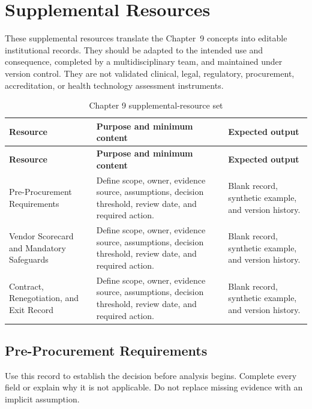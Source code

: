 \section{Supplemental Resources}
\label{sec:comp-ch09-supplemental}

These supplemental resources translate the Chapter~9 concepts into editable
institutional records. They should be adapted to the intended use and consequence,
completed by a multidisciplinary team, and maintained under version control. They
are not validated clinical, legal, regulatory, procurement, accreditation, or health
technology assessment instruments.

\begin{longtable}{@{}p{}p{}p{}@{}}
\caption{Chapter 9 supplemental-resource set}
\label{tab:comp-ch09-supplemental-set}\\
\toprule
\textbf{Resource} & \textbf{Purpose and minimum content} & \textbf{Expected output} \\
\midrule
\endfirsthead
\toprule
\textbf{Resource} & \textbf{Purpose and minimum content} & \textbf{Expected output} \\
\midrule
\endhead
\bottomrule
\endlastfoot
Pre-Procurement Requirements & Define scope, owner, evidence source, assumptions, decision threshold, review date, and required action. & Blank record, synthetic example, and version history. \\
Vendor Scorecard and Mandatory Safeguards & Define scope, owner, evidence source, assumptions, decision threshold, review date, and required action. & Blank record, synthetic example, and version history. \\
Contract, Renegotiation, and Exit Record & Define scope, owner, evidence source, assumptions, decision threshold, review date, and required action. & Blank record, synthetic example, and version history. \\
\end{longtable}

\subsection{Pre-Procurement Requirements}
\label{sec:comp-ch09-supp-1}
Use this record to establish the decision before analysis begins. Complete every
field or explain why it is not applicable. Do not replace missing evidence with an
implicit assumption.

